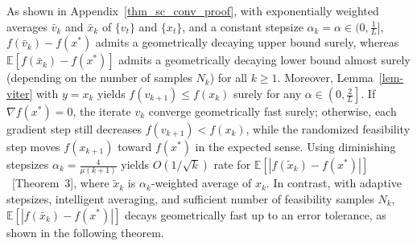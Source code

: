 \documentclass{article}
\newcommand{\EXP}[1]
{\mathbb{E}\!\left[#1\right] }
\theoremstyle{plain}
\theoremstyle{definition}
\theoremstyle{remark}
\begin{document}
%
%
%
%
%



As shown in Appendix~\ref{thm_sc_conv_proof}, with exponentially weighted averages $\bar v_k$ and $\bar x_k$ of $\{v_t\}$ and $\{x_t\}$, and a constant stepsize $\alpha_k = \alpha \in (0, \frac{1}{L}]$, $f(\bar v_k)-f(x^*)$ admits a geometrically decaying upper bound surely, whereas $\EXP{f(\bar x_k)-f(x^*)}$ admits a geometrically decaying lower bound almost surely (depending on the number of samples $N_k$) for all $k \geq 1$. Moreover, Lemma~\ref{lem-viter} with $y=x_k$ yields $f(v_{k+1}) \leq f(x_k)$ surely for any $\alpha \in \left(0, \frac{2}{L} \right]$. If $\nabla f(x^*)=0$, the iterate $v_k$ converge geometrically fast surely; otherwise, each gradient step still decreases $f(v_{k+1}) < f(x_k)$, while the randomized feasibility step moves $f(x_{k+1})$ toward $f(x^*)$ in the expected sense. Using diminishing stepsizes $\alpha_k = \frac{4}{\mu(k+1)}$ yields $O(1/\sqrt{k})$ rate for $\mathbb{E}[|f(\tilde x_k) - f(x^*)|]$~\cite{nedic2019random}[Theorem~3], where $\tilde x_k$ is $\alpha_k$-weighted average of $x_k$. In contrast, with adaptive stepsizes, intelligent averaging, and sufficient number of feasibility samples $N_k$, $\mathbb{E}[|f(\bar x_k) - f(x^*)|]$ decays geometrically fast up to an error tolerance, as shown in the following theorem.
\end{document}
